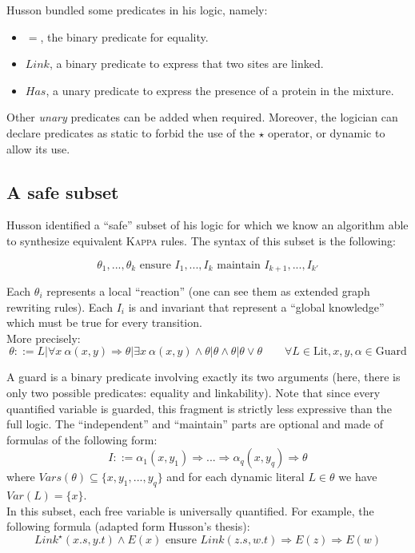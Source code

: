 \documentclass[10pt,a4paper]{article}
\newcommand\Kappa{\textsc{Kappa}}
\begin{document}
Husson bundled some predicates in his logic, namely:
\begin{itemize}
\item $=$, the binary predicate for equality.
\item $Link$, a binary predicate to express that two sites are linked.
\item $Has$, a unary predicate to express the presence of a protein in the mixture.
\end{itemize}

Other \emph{unary} predicates can be added when required. Moreover, the logician can declare predicates as static to forbid the use of the $\star$ operator, or dynamic to allow its use.

\subsection{A safe subset}
Husson identified a ``safe'' subset of his logic for which we know an algorithm able to synthesize equivalent \Kappa{} rules. The syntax of this subset is the following\cite{husson}:
\label{hussonsyntax}

$$ \theta_1,... ,\theta_k \text{ ensure } I_1,...,I_k \text{ maintain } I_{k+1},...,I_{k'} $$

Each $\theta_i$ represents a local ``reaction'' (one can see them as extended graph rewriting rules). Each $I_i$ is and invariant that represent a ``global knowledge'' which must be true for every transition.\\

More precisely:
$$ \theta ::= L | \forall x\ \alpha(x,y) \Rightarrow \theta | \exists x\ \alpha(x,y) \land \theta | \theta \land \theta | \theta \lor \theta \quad \quad \forall L \in \text{Lit},x,y,\alpha \in \text{Guard}$$

A guard is a binary predicate involving exactly its two arguments (here, there is only two possible predicates: equality and linkability). Note that since every quantified variable is guarded, this fragment is strictly less expressive than the full logic.
The ``independent'' and ``maintain'' parts are optional and made of formulas of the following form:
$$ I ::= \alpha_1(x,y_1) \Rightarrow ...\Rightarrow \alpha_q(x,y_q) \Rightarrow \theta $$
\label{criterion}
where $Vars(\theta) \subseteq \{x,y_1,...,y_q\}$ and for each dynamic literal $L \in \theta$ we have $Var(L) = \{x\}$.\\

In this subset, each free variable is universally quantified. For example, the following formula (adapted form Husson's thesis):
$$ Link^\star(x.s,y.t) \land E(x) \text{ ensure } Link(z.s,w.t) \Rightarrow E(z) \Rightarrow E(w) $$
\end{document}
